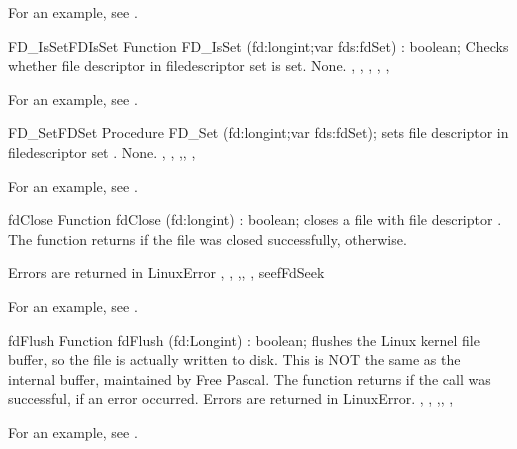 For an example, see .

\begin{functionl}{FD\_IsSet}{FDIsSet}
\Declaration
Function FD\_IsSet (fd:longint;var fds:fdSet) : boolean;
\Description
{} Checks whether file descriptor  in filedescriptor set 
is set.
\Errors
None.
\SeeAlso
{}, , ,
, 
,
\end{functionl}

For an example, see .

\begin{procedurel}{FD\_Set}{FDSet}
\Declaration
Procedure FD\_Set (fd:longint;var fds:fdSet);
\Description
{} sets file descriptor  in filedescriptor set .
\Errors
None.
\SeeAlso
{}, , ,, 
, 
\end{procedurel}

For an example, see .

\begin{function}{fdClose}
\Declaration
Function fdClose (fd:longint) : boolean;
\Description
{} closes a file with file descriptor . The function
returns  if the file was closed successfully, 
otherwise. 

\Errors
Errors are returned in LinuxError
\SeeAlso
{}, , ,,
, seef{FdSeek}
\end{function}
For an example, see .

\begin{function}{fdFlush}
\Declaration
Function fdFlush (fd:Longint) : boolean;
\Description
{} flushes the Linux kernel file buffer, so the file is actually
written to disk. This is NOT the same as the internal buffer, maintained by
Free Pascal. 
The function returns  if the call was successful,  if
an error occurred.
\Errors
Errors are returned in LinuxError.
\SeeAlso
{}, , ,,
, 
\end{function}
For an example, see .

